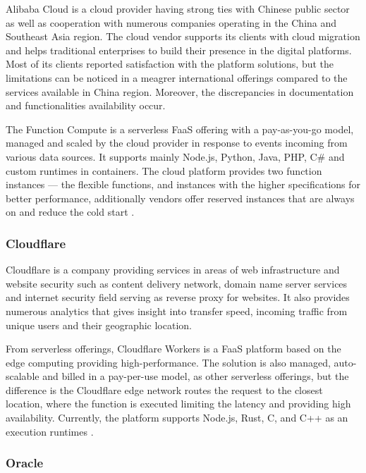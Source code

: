 Alibaba Cloud is a cloud provider having strong ties with Chinese public sector as well as cooperation with numerous companies operating in the China and Southeast Asia region. The cloud vendor supports its clients with cloud migration and helps traditional enterprises to build their presence in the digital platforms. Most of its clients reported satisfaction with the platform solutions, but the limitations can be noticed in a meagrer international offerings compared to the services available in China region. Moreover, the discrepancies in documentation and functionalities availability \cite{Gartner} occur.

The Function Compute is a serverless FaaS offering with a pay-as-you-go model, managed and scaled by the cloud provider in response to events incoming from various data sources. It supports mainly Node.js, Python, Java, PHP, C\# and custom runtimes in containers. The cloud platform provides two function instances --- the flexible functions, and instances with the higher specifications for better performance, additionally vendors offer reserved instances that are always on and reduce the cold start \cite{AlibabaFunctionCompute}.

\subsubsection*{Cloudflare}

Cloudflare is a company providing services in areas of web infrastructure and website security such as content delivery network, domain name server services and internet security field serving as reverse proxy for websites. It also provides numerous analytics that gives insight into transfer speed, incoming traffic from unique users and their geographic location.

From serverless offerings, Cloudflare Workers is a FaaS platform based on the edge computing providing high-performance. The solution is also managed, auto-scalable and billed in a pay-per-use model, as other serverless offerings, but the difference is the Cloudflare edge network routes the request to the closest location, where the function is executed limiting the latency and providing high availability. Currently, the platform supports Node.js, Rust, C, and C++ as an execution runtimes \cite{CloudflareWorkers}.

\subsubsection*{Oracle}

